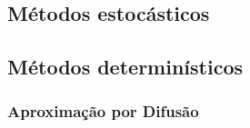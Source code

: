 \subsection{Métodos estocásticos}
\label{subsec:mc}

\subsection{Métodos determinísticos}
\label{subsec:det}


\subsubsection{Aproximação por Difusão}
\label{ssubsec:difusao}

